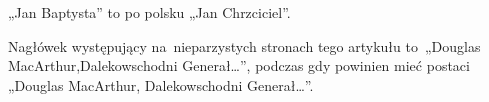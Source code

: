 \documentclass[a4paper,11pt]{article}
\numberwithin{equation}{section}
\begin{document}
\noindent
{} „Jan Baptysta” to po polsku „Jan Chrzciciel”.

\VerSpaceFour





\noindent
{} Nagłówek występujący na~nieparzystych stronach tego artykułu
to~„Douglas MacArthur,Dalekowschodni Generał\ldots”, podczas gdy powinien mieć
postaci „Douglas MacArthur, Dalekowschodni Generał\ldots”.

\VerSpaceFour





\newpage



\begin{center}


\end{center}
\end{document}
